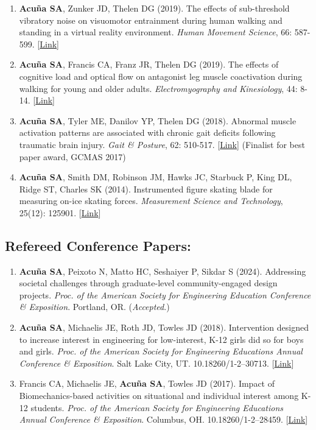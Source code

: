 \documentclass[letterpaper, 10pt]{article}
\begin{document}
\begin{enumerate}
    \item \textbf{Acuña SA}, Zunker JD, Thelen DG (2019). The effects of sub-threshold vibratory noise on visuomotor entrainment during human walking and standing in a virtual reality environment. \textit{Human Movement Science}, 66: 587-599. [\href{https://www.sciencedirect.com/science/article/abs/pii/S0167945719300582}{Link}]
    \item \textbf{Acuña SA}, Francis CA, Franz JR, Thelen DG (2019). The effects of cognitive load and optical ﬂow on antagonist leg muscle coactivation during walking for young and older adults. \textit{Electromyography and Kinesiology}, 44: 8-14. [\href{https://www.sciencedirect.com/science/article/abs/pii/S1050641118303122}{Link}]
    \item \textbf{Acuña SA}, Tyler ME, Danilov YP, Thelen DG (2018). Abnormal muscle activation patterns are associated with chronic gait deﬁcits following traumatic brain injury. \textit{Gait \& Posture}, 62: 510-517. [\href{https://www.sciencedirect.com/science/article/abs/pii/S096663621830359X}{Link}] (Finalist for best paper award, GCMAS 2017)
    \item \textbf{Acuña SA}, Smith DM, Robinson JM, Hawks JC, Starbuck P, King DL, Ridge ST, Charles SK (2014). Instrumented ﬁgure skating blade for measuring on-ice skating forces. \textit{Measurement Science and Technology}, 25(12): 125901. [\href{https://iopscience.iop.org/article/10.1088/0957-0233/25/12/125901}{Link}]
\end{enumerate}

\subsection{Refereed Conference Papers:}
\begin{enumerate}
     \item \textbf{Acuña SA}, Peixoto N, Matto HC, Seshaiyer P, Sikdar S (2024). Addressing societal challenges through graduate-level community-engaged design projects. \textit{Proc. of the American Society for Engineering Education Conference \& Exposition}. Portland, OR. (\textit{Accepted}.) %
     \item \textbf{Acuña SA}, Michaelis JE, Roth JD, Towles JD (2018). Intervention designed to increase interest in engineering for low-interest, K-12 girls did so for boys and girls. \textit{Proc. of the American Society for Engineering Educations Annual Conference \& Exposition}. Salt Lake City, UT. 10.18260/1-2--30713. [\href{https://peer.asee.org/intervention-designed-to-increase-interest-in-engineering-for-low-interest-k-12-girls-did-so-for-boys-and-girls}{Link}] %
     \item Francis CA, Michaelis JE, \textbf{Acuña SA}, Towles JD (2017). Impact of Biomechanics-based activities on situational and individual interest among K-12 students. \textit{Proc. of the American Society for Engineering Educations Annual Conference \& Exposition}. Columbus, OH. 10.18260/1-2--28459. [\href{https://peer.asee.org/impact-of-biomechanics-based-activities-on-situational-and-individual-interest-among-k-12-students}{Link}] %
\end{enumerate}
\end{document}
